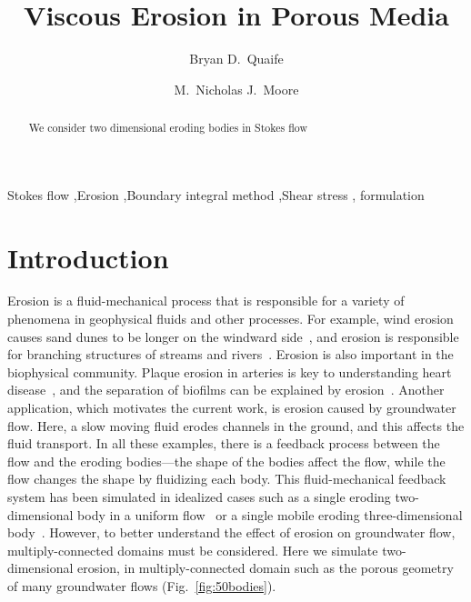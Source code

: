 \documentclass[preprint, 10pt]{elsarticle}
\begin{document}
\title{Viscous Erosion in Porous Media}

\author[Bryan]{Bryan D.~Quaife}
\author[Nick]{M.~Nicholas J.~Moore}
\address[Nick]{Department of Mathematics and Geophysical Fluid Dynamics Institute, Florida State University, Tallahassee, FL, 32306.}
\address[Bryan]{Department of Scientific Computing and Geophysical Fluid Dynamics Institute, Florida State University, Tallahassee, FL, 32306.}

\begin{abstract} 
We consider two dimensional eroding bodies in Stokes flow
\end{abstract}

\begin{keyword}
  Stokes flow \sep Erosion \sep Boundary integral method \sep Shear
  stress \sep {\thL} formulation
\end{keyword}

\maketitle

\section{Introduction\label{s:intro}}
Erosion is a fluid-mechanical process that is responsible for a variety
of phenomena in geophysical fluids and other processes.  For example,
wind erosion causes sand dunes to be  longer on the windward
side~\cite{han1969}, and erosion is responsible for branching structures
of streams and rivers~\cite{coh-dev-sey-yi-szy-rot2015}.  Erosion is
also important in the biophysical community. Plaque erosion in arteries
is key to understanding heart disease~\cite{sha2002,
gro-gij-van-fer-hat-van-yua-wen2007}, and the separation of biofilms can
be explained by erosion~\cite{pic-van-hei2000}.  Another application,
which motivates the current work, is erosion caused by groundwater flow.
Here, a slow moving fluid erodes channels in the ground, and this
affects the fluid transport.  In all these examples, there is a feedback
process between the flow and the eroding bodies---the shape of the
bodies affect the flow, while the flow changes the shape by fluidizing
each body.  This fluid-mechanical feedback system has been simulated in
idealized cases such as a single eroding two-dimensional body in a
uniform flow~\cite{moo-ris-chi-zha-she2013} or a single mobile eroding
three-dimensional body~\cite{mit-spa2016}. However, to better understand
the effect of erosion on groundwater flow, multiply-connected domains
must be considered.  Here we simulate two-dimensional erosion, in
multiply-connected domain such as the porous geometry of many
groundwater flows (Fig.~\ref{fig:50bodies}).
\end{document}
